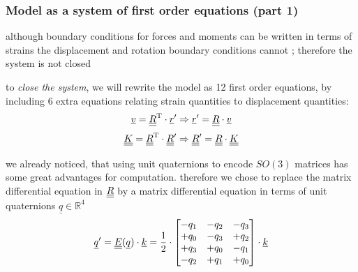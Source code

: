 \begin{frame}
  \frametitle{Model as a system of first order equations (part 1)}
  
  although boundary conditions for forces and moments can be written in terms of strains the displacement and rotation boundary conditions cannot ; therefore the system is not closed
  
  \vspace{0.7em}
  to \textit{close the system}, we will rewrite the model as 12 first order equations, \newline
  by including 6 extra equations relating strain quantities to displacement quantities:
  \begin{displaymath}
    \underline{v} = \underline{\underline{R}}^{\mathrm{T}} \cdot \underline{r}^{\prime}
    \Rightarrow
    \underline{r}^{\prime} = \underline{\underline{R}} \cdot \underline{v}
  \end{displaymath}
  \begin{displaymath}
    \underline{\underline{K}} = \underline{\underline{R}}^{\mathrm{T}} \cdot \underline{\underline{R}}^{\prime}
    \Rightarrow
    \underline{\underline{R}}^{\prime} = \underline{\underline{R}} \cdot \underline{\underline{K}}
  \end{displaymath}
  
  \vspace{0.7em}
  we already noticed, that using unit quaternions to encode $SO(3)$ matrices has some great advantages for computation. therefore we chose to replace the matrix differential equation in $\underline{\underline{R}}$ by a matrix differential equation in terms of unit quaternions $\underline{q} \in \mathbb{R}^4$
  \begin{displaymath}
    \underline{q}^{\prime} = \underline{\underline{E}}(\underline{q}) \cdot \underline{k} =
    \frac{1}{2} \cdot \begin{bmatrix}
      -q_1 & -q_2 & -q_3 \\
      +q_0 & -q_3 & +q_2 \\
      +q_3 & +q_0 & -q_1 \\
      -q_2 & +q_1 & +q_0
    \end{bmatrix} \cdot \underline{k}
  \end{displaymath}
\end{frame}


